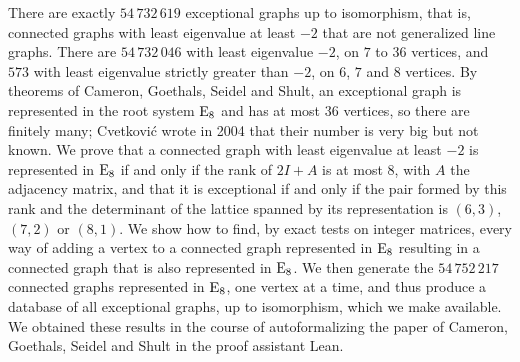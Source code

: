 There are exactly $54\,732\,619$ exceptional graphs up to isomorphism, that is, connected graphs
with least eigenvalue at least $-2$ that are not generalized line graphs. There are $54\,732\,046$ with
least eigenvalue $-2$, on $7$ to $36$ vertices, and $573$ with least eigenvalue strictly greater than
$-2$, on $6$, $7$ and $8$ vertices. By theorems of Cameron, Goethals, Seidel and Shult, an
exceptional graph is represented in the root system $\mathrm{E}_8$ and has at most $36$ vertices, so
there are finitely many; Cvetkovi\'c wrote in 2004 that their number is very big but not known.
We prove that a connected graph with least eigenvalue at least $-2$ is represented in $\mathrm{E}_8$
if and only if the rank of $2I+A$ is at most $8$, with $A$ the adjacency matrix, and that it is
exceptional if and only if the pair formed by this rank and the determinant of the lattice
spanned by its representation is $(6,3)$, $(7,2)$ or $(8,1)$. We show how to find, by exact
tests on integer matrices, every way of adding a vertex to a connected graph represented in
$\mathrm{E}_8$ resulting in a connected graph that is also represented in $\mathrm{E}_8$.
We then generate the $54\,752\,217$ connected graphs represented in $\mathrm{E}_8$, one vertex at a time,
and thus produce a database of all exceptional graphs, up to isomorphism, which we make available.
We obtained these results in the course of
autoformalizing the paper of Cameron, Goethals, Seidel and Shult in the proof assistant Lean.
